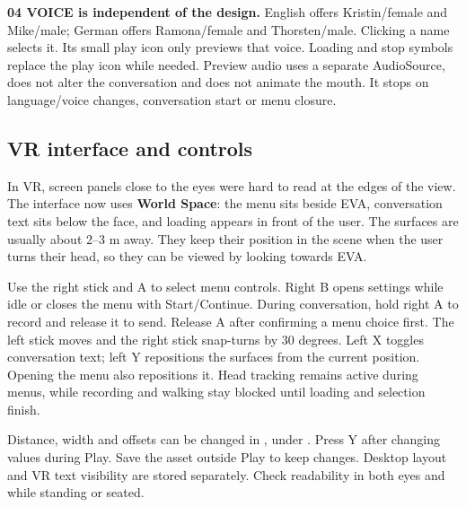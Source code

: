 \textbf{04 VOICE is independent of the design.} English offers Kristin/female
and Mike/male; German offers Ramona/female and Thorsten/male. Clicking a name
selects it. Its small play icon only previews that voice. Loading and stop
symbols replace the play icon while needed. Preview audio uses a separate
AudioSource, does not alter the conversation and does not animate the mouth.
It stops on language/voice changes, conversation start or menu closure.

\subsection{VR interface and controls}
In VR, screen panels close to the eyes were hard to read at the edges of the
view. The interface now uses \textbf{World Space}: the menu sits beside EVA,
conversation text sits below the face, and loading appears in front of the user.
The surfaces are usually about 2--3 m away. They keep their position in the scene
when the user turns their head, so they can be viewed by looking towards EVA.

Use the right stick and A to select menu controls. Right B opens settings while
idle or closes the menu with Start/Continue. During conversation, hold right A
to record and release it to send. Release A after confirming a menu choice first.
The left stick moves and the right stick snap-turns by 30 degrees. Left X toggles
conversation text; left Y repositions the surfaces from the current position.
Opening the menu also repositions it. Head tracking remains active during menus,
while recording and walking stay blocked until loading and selection finish.

Distance, width and offsets can be changed in
, under
. Press Y after changing values during Play. Save the
asset outside Play to keep changes. Desktop layout and VR text visibility are
stored separately. Check readability in both eyes and while standing or seated.

